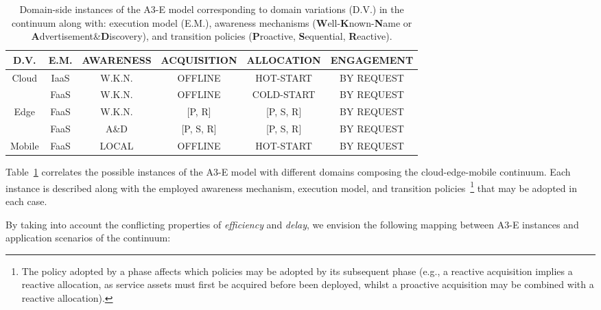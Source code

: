 \begin{center}
	\begin{table}[htbp]
		\small
		\caption{Domain-side instances of the A3-E model corresponding to domain variations (D.V.) in the continuum along with: execution model (E.M.), awareness mechanisms (\textbf{W}ell-\textbf{K}nown-\textbf{N}ame or \textbf{A}dvertisement\&\textbf{D}iscovery), and transition policies (\textbf{P}roactive, \textbf{S}equential, \textbf{R}eactive). }\label{tab:A3-E-instances}
		\begin{tabular}{ c c c c c c }
			\toprule
			
			D.V. & E.M. & \textbf{A}WARENESS & \textbf{A}CQUISITION	& \textbf{A}LLOCATION 	& \textbf{E}NGAGEMENT  	\\
			
			\midrule
			
			\multirow{2}{*}{ Cloud }
			& IaaS	& W.K.N.	& OFFLINE		& HOT-START	& BY REQUEST\\
			& FaaS		& W.K.N.	& OFFLINE		& COLD-START	& BY REQUEST\\\midrule					
			\multirow{2}{*}{ Edge }
			& FaaS		& W.K.N.	& [P, R]		& [P, S, R] 	& BY REQUEST\\
			& FaaS		& A\&D	& [P, S, R]		& [P, S, R]		& BY REQUEST\\\midrule	
			\multirow{1}{*}{ Mobile }
			& FaaS	& LOCAL  & OFFLINE	& HOT-START 	& BY REQUEST\\
			
			\bottomrule
		\end{tabular}
	\end{table}
\end{center}
\normalsize

Table~\ref{tab:A3-E-instances} correlates the possible instances of the A3-E model with different domains composing the cloud-edge-mobile continuum. Each instance is described  along with the employed awareness mechanism, execution model, and transition policies~\footnote{The policy adopted by a phase affects which policies may be adopted by its subsequent phase (e.g., a reactive acquisition implies a reactive allocation, as service assets must first be acquired before been deployed, whilst a proactive acquisition may be combined with a reactive allocation).} that may be adopted in each case. 

By taking into account the conflicting properties of \textit{efficiency} and \textit{delay}, we envision the following mapping between A3-E instances and application scenarios of the continuum:


